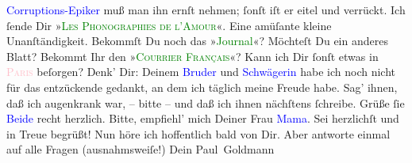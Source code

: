                   \textcolor{blue}{Corruptions-Epiker}{} muß man
               ihn ernſt nehmen; ſonſt iſt er eitel und verrückt.\pend
           \pstart
           Ich ſende Dir »\textsc{\textcolor{green}{Les Phonographies de l’Amour}{}\ledrightnote{\textcolor{green}{Phonographie de l’amour}}}«. Eine amüſante kleine Unanſtändigkeit.\pend
           \pstart
           Bekommſt Du noch das »\textcolor{green}{Journal}{}«? Möchteſt Du ein anderes Blatt? Bekommt Ihr den »\textsc{\textcolor{green}{Courrier 
                     Français}{}\ledrightnote{\textcolor{green}{Le Courrier français}}}«? Kann ich Dir ſonſt etwas in \textsc{\textcolor{pink}{Paris}{}\ledrightnote{\textcolor{pink}{Paris}}} beſorgen?\pend
           \pstart
           {\pb}Denk’ Dir: Deinem \textcolor{blue}{Bruder}{} und \textcolor{blue}{Schwägerin}{} habe ich noch nicht für das
               entzückende \label{K_L02729-9v}\label{K_L02729-9h} gedankt, an dem ich täglich meine Freude habe. Sag’ ihnen, daß ich augenkrank
               war, – bitte – und daß ich ihnen nächſtens ſchreibe. Grüße ſie \textcolor{blue}{Beide}{} recht herzlich.\pend
           \pstart
           Bitte, empfiehl’ mich Deiner Frau \textcolor{blue}{Mama}{}.\pend
           \pstart
           Sei herzlichſt und in Treue begrüßt! Nun höre ich hoffentlich bald von Dir. Aber
               antworte einmal auf alle Fragen (ausnahmsweiſe!) Dein\pend
           \pstart \spacefill\mbox{Paul Goldmann}\pend{}\endnumbering{}\begin{anhang}\end{anhang}
      